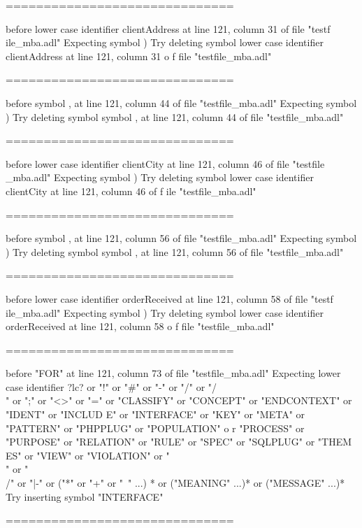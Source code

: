 \begin{description}
\begin{haskell}
{==============================

before lower case identifier clientAddress at line 121, column 31 of file "testf
ile_mba.adl"
Expecting symbol )
Try deleting symbol lower case identifier clientAddress at line 121, column 31 o
f file "testfile_mba.adl"

==============================

before symbol , at line 121, column 44 of file "testfile_mba.adl"
Expecting symbol )
Try deleting symbol symbol , at line 121, column 44 of file "testfile_mba.adl"

==============================

before lower case identifier clientCity at line 121, column 46 of file "testfile
_mba.adl"
Expecting symbol )
Try deleting symbol lower case identifier clientCity at line 121, column 46 of f
ile "testfile_mba.adl"

==============================

before symbol , at line 121, column 56 of file "testfile_mba.adl"
Expecting symbol )
Try deleting symbol symbol , at line 121, column 56 of file "testfile_mba.adl"

==============================

before lower case identifier orderReceived at line 121, column 58 of file "testf
ile_mba.adl"
Expecting symbol )
Try deleting symbol lower case identifier orderReceived at line 121, column 58 o
f file "testfile_mba.adl"

==============================

before "FOR" at line 121, column 73 of file "testfile_mba.adl"
Expecting lower case identifier ?lc? or "!" or "#" or "-" or "/" or "/\\" or ";"
 or "<>" or "=" or "CLASSIFY" or "CONCEPT" or "ENDCONTEXT" or "IDENT" or "INCLUD
E" or "INTERFACE" or "KEY" or "META" or "PATTERN" or "PHPPLUG" or "POPULATION" o
r "PROCESS" or "PURPOSE" or "RELATION" or "RULE" or "SPEC" or "SQLPLUG" or "THEM
ES" or "VIEW" or "VIOLATION" or "\\" or "\\/" or "|-" or ("*" or "+" or "~" ...)
* or ("MEANING" ...)* or ("MESSAGE" ...)*
Try inserting symbol "INTERFACE"

==============================

}
\end{haskell}
\end{description}
